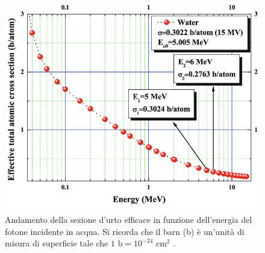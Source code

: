 \documentclass[12pt,a4paper,twoside]{report}
\begin{document}
	\begin{figure}[H]
		\centering
		\includegraphics[width=0.9\linewidth]{attenuation_water.png}
		\caption{Andamento della sezione d'urto efficace in funzione dell'energia del fotone incidente in acqua. Si ricorda che il barn (b) è un'unità di misura di superficie tale che $1\mbox{ b}=10^{-24}\mbox{ cm}^{2}$ \cite{muratRadiation}.}
		\label{fig:attenuation_water}
	\end{figure}
	
\end{document}
